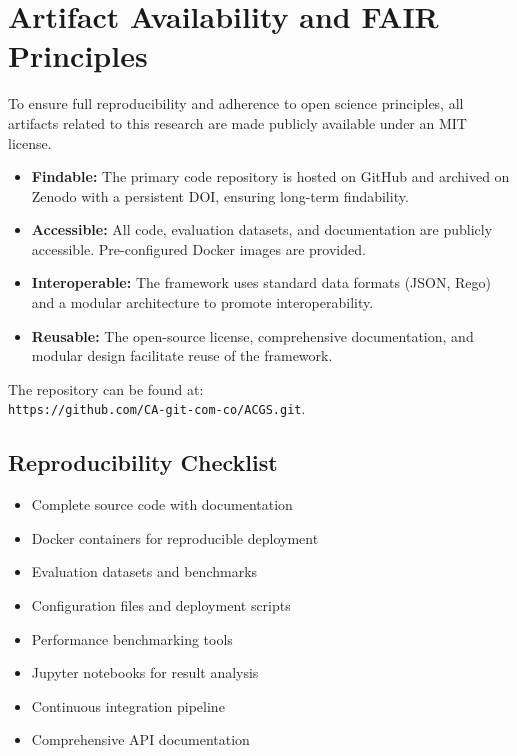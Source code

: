 \section{Artifact Availability and FAIR Principles}\label{sec:appendix_artifacts}
To ensure full reproducibility and adherence to open science principles, all artifacts related to this research are made publicly available under an MIT license.

\begin{itemize}[leftmargin=*,topsep=0pt,itemsep=2pt,parsep=0pt]
    \item \textbf{Findable:} The primary code repository is hosted on GitHub and archived on Zenodo with a persistent DOI, ensuring long-term findability.
    \item \textbf{Accessible:} All code, evaluation datasets, and documentation are publicly accessible. Pre-configured Docker images are provided.
    \item \textbf{Interoperable:} The framework uses standard data formats (JSON, Rego) and a modular architecture to promote interoperability.
    \item \textbf{Reusable:} The open-source license, comprehensive documentation, and modular design facilitate reuse of the framework.
\end{itemize}

The repository can be found at: \\
\texttt{https://github.com/CA-git-com-co/ACGS.git}.

\subsection{Reproducibility Checklist}
\begin{itemize}[leftmargin=*,topsep=0pt,itemsep=2pt,parsep=0pt]
    \item[\checkmarkcustom{}] Complete source code with documentation
    \item[\checkmarkcustom{}] Docker containers for reproducible deployment
    \item[\checkmarkcustom{}] Evaluation datasets and benchmarks
    \item[\checkmarkcustom{}] Configuration files and deployment scripts
    \item[\checkmarkcustom{}] Performance benchmarking tools
    \item[\checkmarkcustom{}] Jupyter notebooks for result analysis
    \item[\checkmarkcustom{}] Continuous integration pipeline
    \item[\checkmarkcustom{}] Comprehensive API documentation
\end{itemize}
